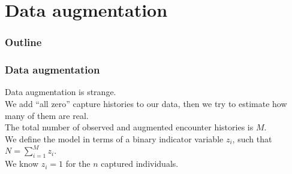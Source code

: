 \documentclass[color=usenames,dvipsnames]{beamer}\usepackage[]{graphicx}\usepackage[]{xcolor}
\begin{document}
\section{Data augmentation}




\begin{frame}
  \frametitle{Outline}
  \Large
  \tableofcontents[currentsection]
\end{frame}



\begin{frame}
  \frametitle{Data augmentation}
  Data augmentation is strange. \\
  \pause
  \vfill
  We add ``all zero'' capture histories to our data, then we try to
  estimate how many of them are real. \\ 
  \pause
  \vfill
  The total number of observed and augmented encounter histories is
  $M$. \\
  \pause
  \vfill
  We define the model in terms of a binary indicator variable $z_i$,
  such that $N=\sum_{i=1}^M z_i$. \\
  \pause
  \vfill
  We know $z_i=1$ for the $n$ captured individuals. \\
\end{frame}
\end{document}
